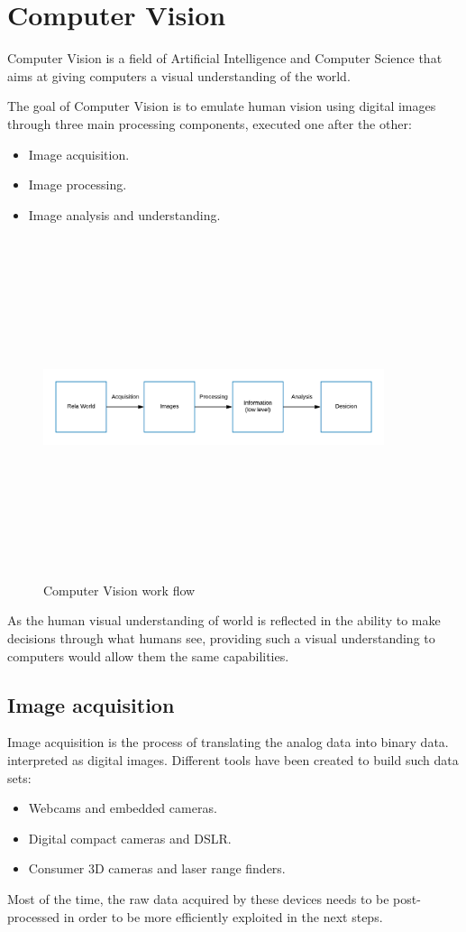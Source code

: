\section{Computer Vision}
Computer Vision is a field of Artificial Intelligence and Computer Science that aims at giving computers a visual understanding of the world.

The goal of Computer Vision is to emulate human vision using digital images through three main processing components, executed one after the other:
\begin{itemize}
    \item Image acquisition.
    \item Image processing.
    \item Image analysis and understanding.
\end{itemize}
\begin{figure}[H]
\centering
\includegraphics[width=10cm,height=10cm,keepaspectratio]{imagenes/ComputerVisionBlocks.png}
\caption{Computer Vision work flow}
\label{fig:ComputerVision}
\end{figure}
As the human visual understanding of world is reflected in the ability to make decisions through what humans see, providing such a visual understanding to computers would allow them the same capabilities.

\subsection{Image acquisition}
Image acquisition is the process of translating the analog data into binary data. interpreted as digital images.
Different tools have been created to build such data sets:
\begin{itemize}
    \item Webcams and embedded cameras.
    \item Digital compact cameras and DSLR.
    \item Consumer 3D cameras and laser range finders.
\end{itemize}
Most of the time, the raw data acquired by these devices needs to be post-processed in order to be more efficiently exploited in the next steps.


